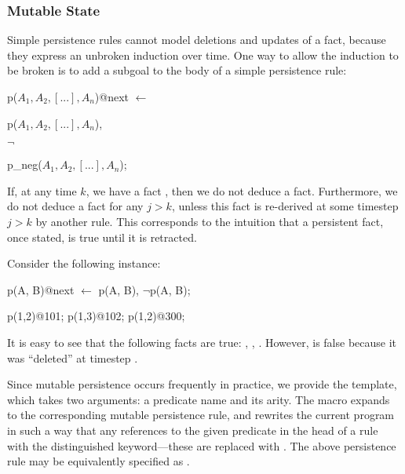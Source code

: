 \subsubsection{Mutable State}
\label{sec:mutable}

Simple persistence rules cannot model deletions and updates of a fact, because
they express an unbroken induction over time.  One way to allow the induction
to be broken is to add a  
subgoal to the body of a simple
persistence rule:

\begin{dedalus}
p($A_1,A_2,[...],A_n$)@next $\leftarrow$
\end{dedalus}

\hspace{5mm}
\begin{dedalus}
p($A_1,A_2,[...],A_n$),
\end{dedalus}

\hspace{5mm}
$\lnot$
\begin{dedalus}
p\_neg($A_1,A_2,[...],A_n$);
\end{dedalus}

\noindent If, at any time $k$, we have a fact
, then we do not deduce a
 fact.  Furthermore, we do not deduce a
 fact for any $j > k$, unless this
 fact is re-derived at some timestep $j > k$ by another rule.
This corresponds to the intuition that a persistent fact, once stated, is true
until it is retracted.

\begin{example}
Consider the following \lang instance:

\begin{Dedalus}
p(A, B)@next \(\leftarrow\) p(A, B), \(\lnot\)p\nega(A, B);

p(1,2)@101;
p(1,3)@102;
p\nega(1,2)@300;
\end{Dedalus}

It is easy to see that the following facts are true: ,
, .  However,  is
false because it was ``deleted'' at timestep .
\end{example}

Since mutable persistence occurs frequently in practice, we provide the
 template, which takes two arguments: a predicate name and
its arity.  The macro expands to the corresponding mutable persistence rule,
and rewrites the current program in such a way that any references to the given
predicate in the
head of a rule with the distinguished 
keyword---these are replaced with .  The above
persistence rule may be equivalently specified as
.

